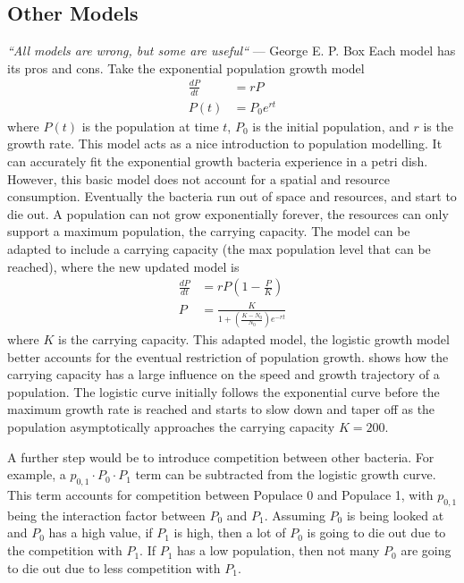 \subsection{Other Models}
\textit{“All models are wrong, but some are useful“} — George E. P. Box \newline \newline
Each model has its pros and cons. 
Take the exponential population growth model 
\begin{align}
    \frac{dP}{dt} &= rP \\
    P(t) &= P_0e^{rt} 
\end{align}
where $P(t)$ is the population at time $t$, $P_0$ is the initial population, and $r$ is the growth rate. 
This model acts as a nice introduction to population modelling. It can accurately fit the exponential growth bacteria experience in a petri dish. 
However, this basic model does not account for a spatial and resource consumption. 
Eventually the bacteria run out of space and resources, and start to die out. 
A population can not grow exponentially forever, the resources can only support a maximum population, the carrying capacity. 
The model can be adapted to include a carrying capacity (the max population level that can be reached), where the new updated model is 
\begin{align}
    \frac{dP}{dt} &= rP(1-\frac{P}{K}) \\ 
    P &= \frac{K}{1 + (\frac{K-N_0}{N_0})e^{-rt}}
\end{align}
where $K$ is the carrying capacity. This adapted model, the logistic growth model better accounts for the eventual restriction of population growth. 
\newline
{} shows how the carrying capacity has a large influence on the speed and growth trajectory of a population. 
The logistic curve initially follows the exponential curve before the maximum growth rate is reached and starts to slow down and taper off as the population asymptotically approaches the carrying capacity $K=200$. 

A further step would be to introduce competition between other bacteria. 
For example, a $p_{0, 1}\cdot P_0 \cdot P_1$ term can be subtracted from the logistic growth curve. 
This term accounts for competition between Populace 0 and Populace 1, with $p_{0, 1}$ being the interaction factor between $P_0$ and $P_1$. 
Assuming $P_0$ is being looked at and $P_0$ has a high value, if $P_1$ is high, then a lot of $P_0$ is going to die out due to the competition with $P_1$. 
If $P_1$ has a low population, then not many $P_0$ are going to die out due to less competition with $P_1$. \\ 

